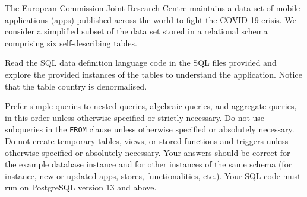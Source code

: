 \documentclass[10pt,a4paper,answers]{exam}
\begin{document}
\begin{questions} 
\question The European Commission Joint Research Centre maintains a data set of mobile applications (apps) published across the world to fight the COVID-19 crisis. We consider a simplified subset of the data set stored in a relational schema comprising six self-describing  tables.

Read the SQL data definition language code in the SQL files provided and explore the provided instances of the tables to understand the application. Notice that the table country is denormalised.

Prefer simple queries to nested queries, algebraic queries, and aggregate queries, in this order unless otherwise specified or strictly necessary. Do not use subqueries in the \verb+FROM+ clause unless otherwise specified or absolutely necessary. Do not create temporary tables, views, or stored functions and triggers unless otherwise specified or absolutely necessary. Your answers should be correct for the example database instance and for other instances of the same schema (for instance, new or updated apps,  stores, functionalities, etc.). Your SQL code must run on PostgreSQL version 13 and above.

\end{questions}
\end{document}
